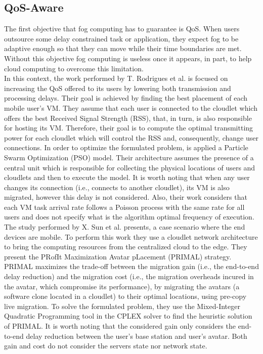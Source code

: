 \subsection{QoS-Aware}\label{sec:QoS}
The first objective that fog computing has to guarantee is QoS. When users outsource some delay constrained task or application, they expect fog to be adaptive enough so that they can move while their time boundaries are met. Without this objective fog computing is useless once it appears, in part, to help cloud computing to overcome this limitation.\\
\noindent\tab In this context, the work performed by T. Rodrigues \cite{rodrigues2017pso} et al. is focused on increasing the QoS offered to its users by lowering both transmission and processing delays.
Their goal is achieved by finding the best placement of each mobile user's VM. They assume that each user is connected to the cloudlet which offers the best Received Signal Strength (RSS), that, in turn, is also responsible for hosting its VM. Therefore, their goal is to compute the optimal transmitting power for each cloudlet which will control the RSS and, consequently, change user connections. In order to optimize the formulated problem, is applied a Particle Swarm Optimization (PSO) model. Their architecture assumes the presence of a central unit which is responsible for collecting the physical locations of users and cloudlets and then to execute the model. It is worth noting that when any user changes its connection (i.e., connects to another cloudlet), its VM is also migrated, however this delay is not considered. Also, their work considers that each VM task arrival rate follows a Poisson process with the same rate for all users and does not specify what is the algorithm optimal frequency of execution.\\
\noindent\tab The study performed by X. Sun et al. \cite{sun2016primal} presents, a case scenario where the end devices are mobile. To perform this work they use a cloudlet network architecture to bring the computing resources from the centralized cloud to the edge. They present the PRofIt Maximization Avatar pLacement (PRIMAL) strategy. PRIMAL maximizes the trade-off between the migration gain (i.e., the end-to-end delay reduction) and the migration cost (i.e., the migration overheads incured in the avatar, which compromise its performance), by migrating the avatars (a software clone located in a cloudlet) to their optimal locations, using  pre-copy live migration. To solve the formulated problem, they use the Mixed-Integer Quadratic Programming tool in the CPLEX solver to find the heuristic solution of PRIMAL. It is worth noting that the considered gain only considers the end-to-end delay reduction between the user's base station and user's avatar. Both gain and cost do not consider the servers state nor network state. \\
